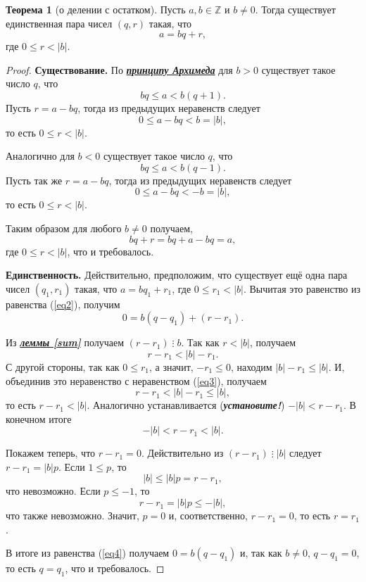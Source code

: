 \documentclass[14pt, a4paper]{extarticle}
\theoremstyle{definition}
\newtheorem{theorem}{Теорема}
\newcommand{\divisible}{\mathop{\vdots}}
\begin{document}
	\begin{theorem}[о делении с остатком]
	\label{ost}
		Пусть $a,b\in\mathbb{Z}$ и $b\neq0$. Тогда существует единственная пара чисел $(q,r)$ такая, что
		\begin{equation}
		\label{eq2}
			a=bq+r,
		\end{equation}
		где $0\leqslant r<|b|$.
	\end{theorem}
	\begin{proof}
		\textbf{Существование.} По \href{https://ru.wikipedia.org/wiki/%D0%90%D0%BA%D1%81%D0%B8%D0%BE%D0%BC%D0%B0_%D0%90%D1%80%D1%85%D0%B8%D0%BC%D0%B5%D0%B4%D0%B0}{\textbf{\textit{принципу Архимеда}}} для $b>0$ существует такое число $q$, что $$bq\leqslant a<b(q+1).$$
		Пусть $r=a-bq$, тогда из предыдущих неравенств следует $$0\leqslant a-bq<b=|b|,$$ то есть $0\leqslant r<|b|$.
		
		Аналогично для $b<0$ существует такое число $q$, что $$bq\leqslant a<b(q-1).$$
		Пусть так же $r=a-bq$, тогда из предыдущих неравенств следует $$0\leqslant a-bq<-b=|b|,$$ то есть $0\leqslant r<|b|$.
		
		Таким образом для любого $b\neq0$ получаем, $$bq+r=bq+a-bq=a,$$ где $0\leqslant r<|b|$, что и требовалось.
		
		\textbf{Единственность.} Действительно, предположим, что существует ещё одна пара чисел $(q_1,r_1)$ такая, что $a=bq_1+r_1$, где $0\leqslant r_1<|b|$. Вычитая это равенство из равенства (\ref{eq2}), получим
		\begin{equation}
		\label{eq4}
			0=b(q-q_1)+(r-r_1).
		\end{equation}
		
		Из \hyperref[sum]{\textbf{\textit{леммы \ref*{sum}}}} получаем $(r-r_1)\divisible b$. Так как $r<|b|$, получаем
		\begin{equation}
		\label{eq3}
			r-r_1<|b|-r_1.
		\end{equation}
		С другой стороны, так как $0\leqslant r_1$, а значит, $-r_1\leqslant 0$, находим \mbox{$|b|-r_1\leqslant |b|$}. И, объединив это неравенство с неравенством (\ref{eq3}), получаем $$r-r_1<|b|-r_1\leqslant |b|,$$ то есть $r-r_1<|b|$. Аналогично устанавливается (\textbf{\textit{установите!}}) $-|b|<r-r_1$. В конечном итоге $$-|b|<r-r_1<|b|.$$
		
		Покажем теперь, что $r-r_1=0$. Действительно из $(r-r_1)\divisible|b|$ следует $r-r_1=|b|p$. Если $1\leqslant p$, то $$|b|\leqslant|b|p=r-r_1,$$ что невозможно. Если $p\leqslant-1$, то $$r-r_1=|b|p\leqslant -|b|,$$ что также невозможно. Значит, $p=0$ и, соответственно, $r-r_1=0$, то есть $r=r_1$.
		
		В итоге из равенства (\ref{eq4}) получаем $0=b(q-q_1)$ и, так как $b\neq0$, $q-q_1=0$, то есть $q=q_1$, что и требовалось.
	\end{proof}
\end{document}
